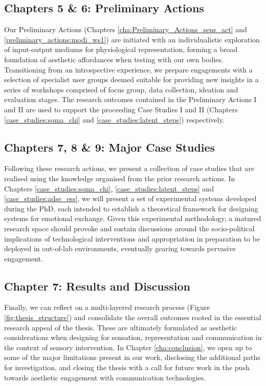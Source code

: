 \subsection*{Chapters 5 \& 6: Preliminary Actions}

Our Preliminary Actions (Chapters \ref{cha:Preliminary_Actions_sens_act} and \ref{preliminary_actions:modi_ws1}) are initiated with an individualistic exploration of input-output mediums for physiological representation, forming a broad foundation of aesthetic affordances when testing with our own bodies. Transitioning from an introspective experience, we prepare engagements with a selection of specialist user groups deemed suitable for providing new insights in a series of workshops comprised of focus group, data collection, ideation and evaluation stages. The research outcomes contained in the Preliminary Actions I and II are used to support the proceeding Case Studies I and II (Chapters \ref{case_studies:soma_chi} and \ref{case_studies:latent_steps}) respectively.

\subsection*{Chapters 7, 8 \& 9: Major Case Studies}

Following these research actions, we present a collection of case studies that are realised using the knowledge organised from the prior research actions. In Chapters \ref{case_studies:soma_chi}, \ref{case_studies:latent_steps} and \ref{case_studies:adse_ess}, we will present a set of experimental systems developed during the PhD, each intended to establish a theoretical framework for designing systems for emotional exchange. Given this experimental methodology, a matured research space should provoke and sustain discussions around the socio-political implications of technological interventions and appropriation in preparation to be deployed in out-of-lab environments, eventually gearing towards pervasive engagement.

\subsection*{Chapter 7: Results and Discussion}

Finally, we can reflect on a multi-layered research process (Figure \ref{fig:thesis_structure}) and consolidate the overall outcomes rooted in the essential research appeal of the thesis. These are ultimately formulated as aesthetic considerations when designing for sensation, representation and communication in the context of sensory intervention. In Chapter \ref{cha:conclusion}, we open up to some of the major limitations present in our work, disclosing the additional paths for investigation, and closing the thesis with a call for future work in the push towards aesthetic engagement with communication technologies.


